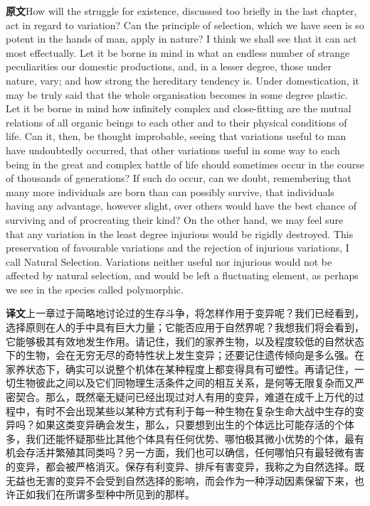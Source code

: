 \documentclass[UTF8,zihao=-4]{ctexart}
\newcommand{\BodyFont}{\fontsize{10.5pt}{15.5pt}\selectfont}
\newcommand{\origlabel}{\textbf{原文}\quad}
\newcommand{\translabel}{\textbf{译文}\quad}
\newenvironment{enblock}{\par\noindent\begingroup\BodyFont\origlabel}{\par\endgroup}
\newenvironment{zhblock}{\par\noindent\begingroup\BodyFont\translabel}{\par\endgroup\vspace{0.35em}}
\newcommand{\pair}[2]{\begin{enblock}#1\end{enblock}\begin{zhblock}#2\end{zhblock}}
\begin{document}
\pair{How will the struggle for existence, discussed too briefly in the last chapter, act in regard to variation? Can the principle of selection, which we have seen is so potent in the hands of man, apply in nature? I think we shall see that it can act most effectually. Let it be borne in mind in what an endless number of strange peculiarities our domestic productions, and, in a lesser degree, those under nature, vary; and how strong the hereditary tendency is. Under domestication, it may be truly said that the whole organisation becomes in some degree plastic. Let it be borne in mind how infinitely complex and close-fitting are the mutual relations of all organic beings to each other and to their physical conditions of life. Can it, then, be thought improbable, seeing that variations useful to man have undoubtedly occurred, that other variations useful in some way to each being in the great and complex battle of life should sometimes occur in the course of thousands of generations? If such do occur, can we doubt, remembering that many more individuals are born than can possibly survive, that individuals having any advantage, however slight, over others would have the best chance of surviving and of procreating their kind? On the other hand, we may feel sure that any variation in the least degree injurious would be rigidly destroyed. This preservation of favourable variations and the rejection of injurious variations, I call Natural Selection. Variations neither useful nor injurious would not be affected by natural selection, and would be left a fluctuating element, as perhaps we see in the species called polymorphic.}{上一章过于简略地讨论过的生存斗争，将怎样作用于变异呢？我们已经看到，选择原则在人的手中具有巨大力量；它能否应用于自然界呢？我想我们将会看到，它能够极其有效地发生作用。请记住，我们的家养生物，以及程度较低的自然状态下的生物，会在无穷无尽的奇特性状上发生变异；还要记住遗传倾向是多么强。在家养状态下，确实可以说整个机体在某种程度上都变得具有可塑性。再请记住，一切生物彼此之间以及它们同物理生活条件之间的相互关系，是何等无限复杂而又严密契合。那么，既然毫无疑问已经出现过对人有用的变异，难道在成千上万代的过程中，有时不会出现某些以某种方式有利于每一种生物在复杂生命大战中生存的变异吗？如果这类变异确会发生，那么，只要想到出生的个体远比可能存活的个体多，我们还能怀疑那些比其他个体具有任何优势、哪怕极其微小优势的个体，最有机会存活并繁殖其同类吗？另一方面，我们也可以确信，任何哪怕只有最轻微有害的变异，都会被严格消灭。保存有利变异、排斥有害变异，我称之为自然选择。既无益也无害的变异不会受到自然选择的影响，而会作为一种浮动因素保留下来，也许正如我们在所谓多型种中所见到的那样。}
\end{document}
